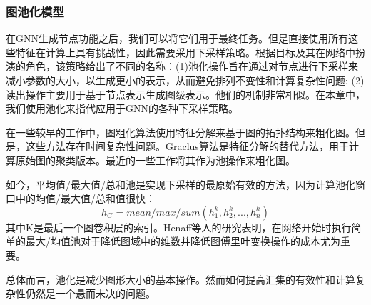 \subsubsection{图池化模型}
在GNN生成节点功能之后，我们可以将它们用于最终任务。但是直接使用所有这些特征在计算上具有挑战性，因此需要采用下采样策略。根据目标及其在网络中扮演的角色，该策略给出了不同的名称：(1)池化操作旨在通过对节点进行下采样来减小参数的大小，以生成更小的表示，从而避免排列不变性和计算复杂性问题; (2)读出操作主要用于基于节点表示生成图级表示。他们的机制非常相似。在本章中，我们使用池化来指代应用于GNN的各种下采样策略。

在一些较早的工作中，图粗化算法使用特征分解来基于图的拓扑结构来粗化图。但是，这些方法存在时间复杂性问题。Graclus算法是特征分解的替代方法，用于计算原始图的聚类版本。最近的一些工作将其作为池操作来粗化图。

如今，平均值/最大值/总和池是实现下采样的最原始有效的方法，因为计算池化窗口中的均值/最大值/总和值很快：
\[
h_G=mean/max/sum(h_1^{k},h_2^{k},...,h_n^{k})
\]
其中K是最后一个图卷积层的索引。Henaff等人的研究\cite{henaff2015deep}表明，在网络开始时执行简单的最大/均值池对于降低图域中的维数并降低图傅里叶变换操作的成本尤为重要。

总体而言，池化是减少图形大小的基本操作。然而如何提高汇集的有效性和计算复杂性仍然是一个悬而未决的问题。